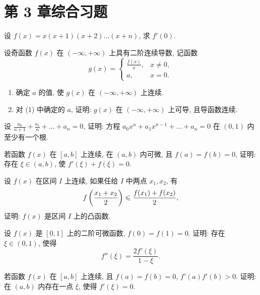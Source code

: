 \section*{第 3 章综合习题}

\begin{exercise}[3.C.1]
    设 $f(x) = x(x+1)(x+2)\dots(x+n)$, 求 $f'(0)$.
\end{exercise}

\begin{exercise}[3.C.2]
    设奇函数 $f(x)$ 在 $(-\infty, +\infty)$ 上具有二阶连续导数, 记函数
    $$g(x) = \begin{cases} \frac{f(x)}{x}, & x \ne 0, \\ a, & x = 0. \end{cases}$$
    \begin{enumerate}
        \item 确定 $a$ 的值, 使 $g(x)$ 在 $(-\infty, +\infty)$ 上连续.
        \item 对 (1) 中确定的 $a$, 证明: $g(x)$ 在 $(-\infty, +\infty)$ 上可导, 且导函数连续.
    \end{enumerate}
\end{exercise}

\begin{exercise}[3.C.3]
    设 $\frac{a_0}{n+1} + \frac{a_1}{n} + \dots + a_n = 0$, 证明: 方程 $a_0 x^n + a_1 x^{n-1} + \dots + a_n = 0$ 在 $(0, 1)$ 内至少有一个根.
\end{exercise}

\begin{exercise}[3.C.4]
    若函数 $f(x)$ 在 $[a, b]$ 上连续, 在 $(a, b)$ 内可微, 且 $f(a) = f(b) = 0$, 证明: 存在 $\xi \in (a, b)$, 使 $f'(\xi) + f(\xi) = 0$.
\end{exercise}

\begin{exercise}[3.C.5]
    设 $f(x)$ 在区间 $I$ 上连续, 如果任给 $I$ 中两点 $x_1, x_2$, 有
    $$f\left(\frac{x_1 + x_2}{2}\right) \leqslant \frac{f(x_1) + f(x_2)}{2},$$
    证明: $f(x)$ 是区间 $I$ 上的凸函数.
\end{exercise}

\begin{exercise}[3.C.6]
    设 $f(x)$ 是 $[0, 1]$ 上的二阶可微函数, $f(0) = f(1) = 0$. 证明: 存在 $\xi \in (0, 1)$, 使得
    $$f''(\xi) = \frac{2 f'(\xi)}{1 - \xi}.$$
\end{exercise}

\begin{exercise}[3.C.7]
    若函数 $f(x)$ 在 $[a, b]$ 上连续, 且 $f(a) = f(b) = 0$, $f'(a)f'(b) > 0$. 证明: 在 $(a, b)$ 内存在一点 $\xi$, 使得 $f'(\xi) = 0$.
\end{exercise}

